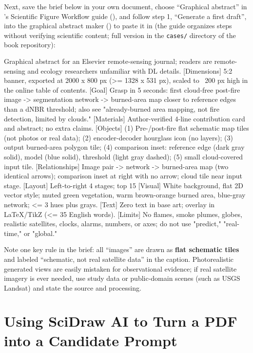 Next, save the brief below in your own document, choose ``Graphical abstract'' in \scidraw{}'s Scientific Figure Workflow guide (), and follow step 1, ``Generate a first draft'', into the graphical abstract maker () to paste it in (the guide organizes steps without verifying scientific content; full version in the \texttt{cases/} directory of the book repository):

\begin{Prompt}
 Graphical abstract for an Elsevier remote-sensing journal;
readers are remote-sensing and ecology researchers unfamiliar with DL details.
[Dimensions] 5:2 banner, exported at 2000 x 800 px (>= 1328 x 531 px), scaled
to ~200 px high in the online table of contents.
[Goal] Grasp in 5 seconds: first cloud-free post-fire image -> segmentation
network -> burned-area map closer to reference edges than a dNBR threshold;
also see "already-burned area mapping, not fire detection, limited by clouds."
[Materials] Author-verified 4-line contribution card and abstract; no extra claims.
[Objects] (1) Pre-/post-fire flat schematic map tiles (not photos or real data);
(2) encoder-decoder hourglass icon (no layers); (3) output burned-area polygon
tile; (4) comparison inset: reference edge (dark gray solid), model (blue solid),
threshold (light gray dashed); (5) small cloud-covered input tile.
[Relationships] Image pair -> network -> burned-area map (two identical arrows);
comparison inset at right with no arrow; cloud tile near input stage.
[Layout] Left-to-right 4 stages; top 15%
[Visual] White background, flat 2D vector style; muted green vegetation, warm
brown-orange burned area, blue-gray network; <= 3 hues plus grays.
[Text] Zero text in base art; overlay in LaTeX/TikZ (<= 35 English words).
[Limits] No flames, smoke plumes, globes, realistic satellites, clocks, alarms,
numbers, or axes; do not use "predict," "real-time," or "global."
\end{Prompt}

Note one key rule in the brief: all ``images'' are drawn as \textbf{flat schematic tiles} and labeled ``schematic, not real satellite data'' in the caption. Photorealistic generated views are easily mistaken for observational evidence; if real satellite imagery is ever needed, use study data or public-domain scenes (such as USGS Landsat) and state the source and processing.

\section{Using SciDraw AI to Turn a PDF into a Candidate Prompt}

